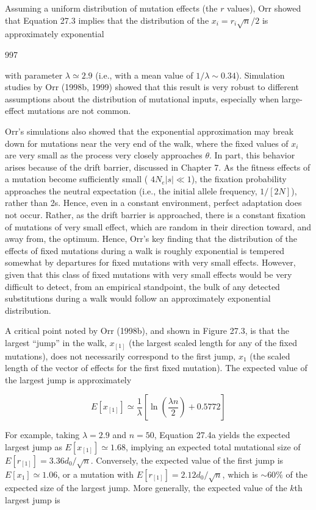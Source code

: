 \documentclass{article}
\begin{document}
Assuming a uniform distribution of mutation effects (the $r$ values), Orr showed that Equation 27.3 implies that the distribution of the $x_i = r_i \sqrt{n}/2$ is approximately exponential

997

with parameter  $ \lambda \simeq 2.9 $ (i.e., with a mean value of  $ 1/\lambda \sim 0.34 $). Simulation studies by Orr (1998b, 1999) showed that this result is very robust to different assumptions about the distribution of mutational inputs, especially when large-effect mutations are not common.

Orr's simulations also showed that the exponential approximation may break down for mutations near the very end of the walk, where the fixed values of  $ x_i $ are very small as the process very closely approaches  $ \theta $. In part, this behavior arises because of the drift barrier, discussed in Chapter 7. As the fitness effects of a mutation become sufficiently small ( $ 4N_e|s| \ll 1 $), the fixation probability approaches the neutral expectation (i.e., the initial allele frequency,  $ 1/[2N] $), rather than 2s. Hence, even in a constant environment, perfect adaptation does not occur. Rather, as the drift barrier is approached, there is a constant fixation of mutations of very small effect, which are random in their direction toward, and away from, the optimum. Hence, Orr's key finding that the distribution of the effects of fixed mutations during a walk is roughly exponential is tempered somewhat by departures for fixed mutations with very small effects. However, given that this class of fixed mutations with very small effects would be very difficult to detect, from an empirical standpoint, the bulk of any detected substitutions during a walk would follow an approximately exponential distribution.

A critical point noted by Orr (1998b), and shown in Figure 27.3, is that the largest “jump” in the walk,  $ x_{[1]} $ (the largest scaled length for any of the fixed mutations), does not necessarily correspond to the first jump,  $ x_{1} $ (the scaled length of the vector of effects for the first fixed mutation). The expected value of the largest jump is approximately

\begin{equation}
E[x_{[1]}]\simeq\frac{1}{\lambda}\left[\ln\left(\frac{\lambda n}{2}\right)+0.5772\right]
\tag{27.4a}
\label{eq:27_4a}
\end{equation}

For example, taking  $ \lambda = 2.9 $ and  $ n = 50 $, Equation 27.4a yields the expected largest jump as  $ E[x_{[1]}] \simeq 1.68 $, implying an expected total mutational size of  $ E[r_{[1]}] = 3.36d_0/\sqrt{n} $. Conversely, the expected value of the first jump is  $ E[x_1] \simeq 1.06 $, or a mutation with  $ E[r_{[1]}] = 2.12d_0/\sqrt{n} $, which is  $ \sim 60\% $ of the expected size of the largest jump. More generally, the expected value of the  $ k $th largest jump is
\end{document}
